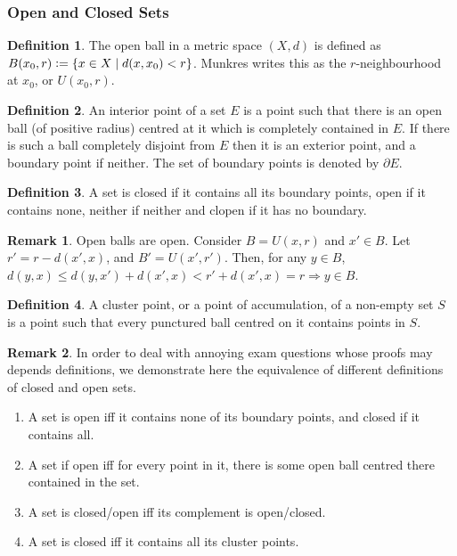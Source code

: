 \documentclass{article}
\theoremstyle{definition}
\newtheorem{defn}{Definition}[subsubsection]
\newtheorem{rmk}{Remark}[subsubsection]
\begin{document}
\subsubsection{Open and Closed Sets}
\begin{defn}
	The open ball in a metric space $(X,d)$ is defined as $B(x_0,r)\vcentcolon=\{x\in X\mid d(x,x_0)<r\}$. Munkres writes this as the $r$-neighbourhood at $x_0$, or $U(x_0,r)$.
\end{defn}
\begin{defn}
	An interior point of a set $E$ is a point such that there is an open ball (of positive radius) centred at it which is completely contained in $E$. If there is such a ball completely disjoint from $E$ then it is an exterior point, and a boundary point if neither. The set of boundary points is denoted by $\partial E$.
\end{defn}
\begin{defn}
	A set is closed if it contains all its boundary points, open if it contains none, neither if neither and clopen if it has no boundary.
\end{defn}
\begin{rmk}
	Open balls are open. Consider $B=U(x,r)$ and $x'\in B$. Let $r'=r-d(x',x)$, and $B'=U(x',r')$. Then, for any $y\in B$, $d(y,x)\leq d(y,x')+d(x',x)<r'+d(x',x)=r\Rightarrow y\in B$.
\end{rmk}
\begin{defn}
	A cluster point, or a point of accumulation, of a non-empty set $S$ is a point such that every punctured ball centred on it contains points in $S$.
\end{defn}
\begin{rmk}
	In order to deal with annoying exam questions whose proofs may depends definitions, we demonstrate here the equivalence of different definitions of closed and open sets.
	\begin{enumerate}
		\item A set is open iff it contains none of its boundary points, and closed if it contains all.
		\item A set if open iff for every point in it, there is some open ball centred there contained in the set.
		\item A set is closed/open iff its complement is open/closed.
		\item A set is closed iff it contains all its cluster points.
	\end{enumerate}
\end{rmk}
\end{document}
